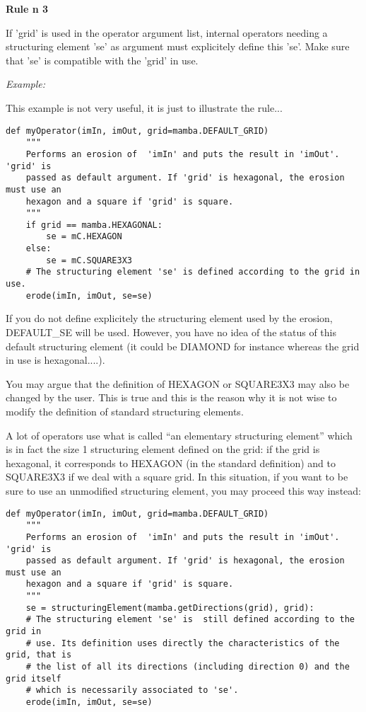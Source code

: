 \documentclass[a4paper,10pt,oneside]{article}
\begin{document}
\par
    
\textbf{Rule n\textdegree{} 3}

If 'grid' is used in the operator argument list, internal operators needing a 
structuring element 'se' as argument must explicitely define this 'se'. Make 
sure that 'se' is compatible with the 'grid' in use.\par 

\emph{Example:}

This example is not very useful, it is just to illustrate the rule...

\lstset{language=Python}
\begin{lstlisting}
def myOperator(imIn, imOut, grid=mamba.DEFAULT_GRID)
    """
    Performs an erosion of  'imIn' and puts the result in 'imOut'. 'grid' is
    passed as default argument. If 'grid' is hexagonal, the erosion must use an 
    hexagon and a square if 'grid' is square.
    """
    if grid == mamba.HEXAGONAL:
        se = mC.HEXAGON
    else:
        se = mC.SQUARE3X3
    # The structuring element 'se' is defined according to the grid in use.
    erode(imIn, imOut, se=se)
\end{lstlisting}

If you do not define explicitely the structuring element used by the erosion, 
DEFAULT\_SE will be used. However, you have no idea of  the status of this 
default structuring element (it could be DIAMOND for instance whereas the grid 
in use is hexagonal....).

You may argue that the definition of HEXAGON or SQUARE3X3 may also be changed by 
the user. This is true and this is the reason why it is not wise to modify the 
definition of standard structuring elements.

A lot of operators use what is called ``an elementary structuring element'' 
which is in fact the size 1 structuring element defined on the grid: if the grid 
is hexagonal, it corresponds to HEXAGON (in the standard definition) and to 
SQUARE3X3 if we deal with a square grid. In this situation, if you want to be 
sure to use an unmodified structuring element, you may proceed this way instead:

\lstset{language=Python}
\begin{lstlisting}
def myOperator(imIn, imOut, grid=mamba.DEFAULT_GRID)
    """
    Performs an erosion of  'imIn' and puts the result in 'imOut'. 'grid' is
    passed as default argument. If 'grid' is hexagonal, the erosion must use an 
    hexagon and a square if 'grid' is square.
    """
    se = structuringElement(mamba.getDirections(grid), grid):
    # The structuring element 'se' is  still defined according to the grid in 
    # use. Its definition uses directly the characteristics of the grid, that is
    # the list of all its directions (including direction 0) and the grid itself
    # which is necessarily associated to 'se'.
    erode(imIn, imOut, se=se)
\end{lstlisting}
\end{document}
